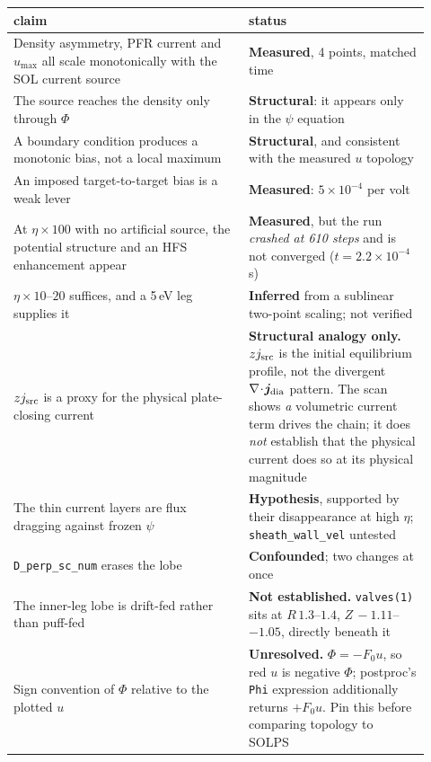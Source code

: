 \documentclass[11pt,a4paper]{article}
\newcommand{\code}[1]{\texttt{\small #1}}
\begin{document}
\begin{center}
\begin{tabular}{p{0.52\linewidth}p{0.40\linewidth}}
\toprule
claim & status \\
\midrule
Density asymmetry, PFR current and $u_{\max}$ all scale monotonically with the SOL current source & \textbf{Measured}, 4 points, matched time \\[2pt]
The source reaches the density only through $\Phi$ & \textbf{Structural}: it appears only in the $\psi$ equation \\[2pt]
A boundary condition produces a monotonic bias, not a local maximum & \textbf{Structural}, and consistent with the measured $u$ topology \\[2pt]
An imposed target-to-target bias is a weak lever & \textbf{Measured}: $5\times10^{-4}$ per volt \\[2pt]
At $\eta\times100$ with no artificial source, the potential structure and an HFS enhancement appear & \textbf{Measured}, but the run \emph{crashed at 610 steps} and is not converged ($t=2.2\times10^{-4}$\,s) \\[2pt]
$\eta\times10$--$20$ suffices, and a 5\,eV leg supplies it & \textbf{Inferred} from a sublinear two-point scaling; not verified \\[2pt]
$zj_{\rm src}$ is a proxy for the physical plate-closing current & \textbf{Structural analogy only.} $zj_{\rm src}$ is the initial equilibrium profile, not the divergent $\nabla\!\cdot\!\bm j_{\rm dia}$ pattern. The scan shows \emph{a} volumetric current term drives the chain; it does \emph{not} establish that the physical current does so at its physical magnitude \\[2pt]
The thin current layers are flux dragging against frozen $\psi$ & \textbf{Hypothesis}, supported by their disappearance at high $\eta$; \code{sheath\_wall\_vel} untested \\[2pt]
\code{D\_perp\_sc\_num} erases the lobe & \textbf{Confounded}; two changes at once \\[2pt]
The inner-leg lobe is drift-fed rather than puff-fed & \textbf{Not established.} \code{valves(1)} sits at $R\,1.3$--$1.4$, $Z\,-1.11$--$-1.05$, directly beneath it \\[2pt]
Sign convention of $\Phi$ relative to the plotted $u$ & \textbf{Unresolved.} $\Phi=-F_0u$, so red $u$ is negative $\Phi$; postproc's \code{Phi} expression additionally returns $+F_0u$. Pin this before comparing topology to SOLPS \\
\bottomrule
\end{tabular}
\end{center}
\end{document}
